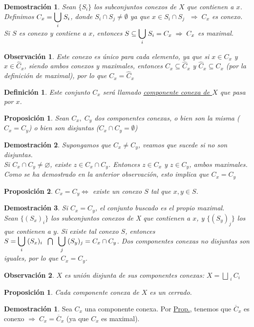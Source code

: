 \documentclass[12pt,twoside]{report}
\theoremstyle{azul}
\newtheorem*{propx}{Proposición}
\newtheorem*{demx}{Demostración}
\newtheorem*{defix}{Definición}
\theoremstyle{azul2}
\newtheorem*{obsx}{Observación}
\theoremstyle{plain}
\newtheorem*{prop}{Proposición}
\theoremstyle{definition}
\newtheorem*{dem}{Demostración}
\theoremstyle{remark}
\begin{document}
\begin{demx}
Sean $\{ S_i \}$ los subconjuntos conexos de $X$ que contienen a $x$.\\ Definimos $C_x=\mathlarger{\underset{i}{\bigcup}}\;  S_i$, donde $S_i \cap S_j \neq \emptyset $ ya que $x \in S_i \cap S_j\;$
$\Rightarrow \;C_x$ es conexo.\\
Si $S$ es conexo y contiene a $x$, entonces $S \subseteq \mathlarger{\underset{i}{\bigcup}}\; S_i = C_x \; \Rightarrow \; C_x$ es maximal.
\end{demx}

\begin{obsx}
Este conexo es único para cada elemento, ya que si $x \in C_x$ y $x \in \hat{C}_x$, siendo ambos conexos y maximales, entonces $C_x \subseteq \hat{C}_x$ y $\hat{C}_x \subseteq C_x$ (por la definición de maximal), por lo que $C_x = \hat{C}_x$
\end{obsx}

\begin{defix}
Este conjunto $C_x$ será llamado \underline{componente conexa de $X$} que pasa por $x$.
\end{defix}
\begin{propx}
Sean $C_x, \; C_y$ dos componentes conexas, o bien son la misma ($C_x=C_y$) o bien son disjuntas ($C_x \cap C_y = \emptyset$)
\end{propx}
\begin{demx} \label{dempito}
Supongamos que $C_x \neq C_y$, veamos que sucede si no son disjuntas. \\
Si $C_x \cap C_y \neq \varnothing$, existe $z \in C_x \cap C_y$. Entonces $z \in C_x$ y $z \in C_y$, ambos maximales. Como se ha demostrado en la anterior observación, esto implica que $C_x = C_y$
\end{demx}

\begin{propx}
$C_x = C_y \Leftrightarrow $ existe un conexo $S$ tal que $x,y \in S$.
\end{propx}
\begin{demx}
Si $C_x = C_y$, el conjunto buscado es el propio maximal.\\
Sean $\{(S_x)_i\}$ los subconjuntos conexos de X que contienen a $x$, y $\{(S_y)_j\}$ los que contienen a $y$. Si existe tal conexo $S$, entonces $S = \mathlarger{\underset{i}{\bigcup}}\;  (S_x)_i \;\; \bigcap \;\; \mathlarger{\underset{j}{\bigcup}}\;  (S_y)_j = C_x \cap C_y$. Dos componentes conexas no disjuntas son iguales, por lo que $C_x = C_y$. 
\end{demx}
\begin{obsx}
$X$ es unión disjunta de sus componentes conexas: $X=\underset{i}{\bigsqcup \;} C_i$
\end{obsx}
\begin{prop}
Cada componente conexa de $X$ es un cerrado. 
\end{prop}
\begin{dem}
Sea $C_x$ una componente conexa. Por \textcolor{blue}{\hyperref[propito]{Prop.}}, tenemos que $\overline{C}_x$ es conexo $\Rightarrow \; C_x = \overline{C}_x$ (ya que $C_x$ es maximal).
\end{dem}
\end{document}
